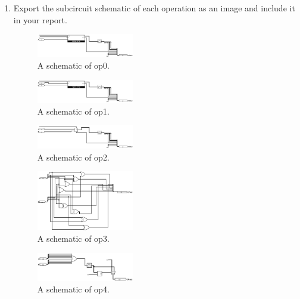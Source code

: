 \documentclass{article}
\begin{document}
\begin{enumerate}
\item Export the subcircuit schematic of each operation as an image and include it in your report.

\begin{figure}[ht!]
    \centering
    \includegraphics[width=0.4\textwidth]{lab3_op0.png}
    \caption{A schematic of op0.}
    \label{f:op0}
\end{figure}

\begin{figure}[ht!]
    \centering
    \includegraphics[width=0.4\textwidth]{lab3_op1.png}
    \caption{A schematic of op1.}
    \label{f:op1}
\end{figure}

\begin{figure}[ht!]
    \centering
    \includegraphics[width=0.4\textwidth]{lab3_op2.png}
    \caption{A schematic of op2.}
    \label{f:op2}
\end{figure}

\begin{figure}[ht!]
    \centering
    \includegraphics[width=0.4\textwidth]{lab3_op3.png}
    \caption{A schematic of op3.}
    \label{f:op3}
\end{figure}

\begin{figure}[ht!]
    \centering
    \includegraphics[width=0.4\textwidth]{lab3_op4.png}
    \caption{A schematic of op4.}
    \label{f:op4}
\end{figure}


\end{enumerate}
\end{document}
